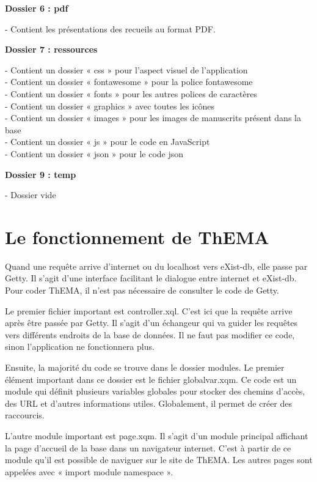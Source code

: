 \textbf{Dossier 6 : pdf} 
\begin{flushleft}	
	- Contient les présentations des recueils au format PDF.
\end{flushleft}	
	
\textbf{Dossier 7 : ressources}
\begin{flushleft}		
	 - Contient un dossier « css » pour l'aspect visuel de l'application \\
	 - Contient un dossier « fontawesome » pour la police fontawesome \\
	 - Contient un dossier « fonts » pour les autres polices de caractères \\
	 - Contient un dossier « graphics » avec toutes les icônes \\
	 - Contient un dossier « images » pour les images de manuscrits présent dans la base \\
	 - Contient un dossier « js » pour le code en JavaScript \\
	 - Contient un dossier « json » pour le code json \\
\end{flushleft}	
 
\textbf{Dossier 9 : temp}
\begin{flushleft}	
	 - Dossier vide
\end{flushleft}	
	
	\section{Le fonctionnement de ThEMA}
	Quand une requête arrive d'internet ou du localhost vers eXist-db, elle passe par Getty. Il s'agit d'une interface facilitant le dialogue entre internet et eXist-db. Pour coder ThEMA, il n'est pas nécessaire de consulter le code de Getty.
	
	Le premier fichier important est controller.xql. C'est ici que la requête arrive après être passée par Getty. Il s'agit d'un échangeur qui va guider les requêtes vers différents endroits de la base de données. Il ne faut pas modifier ce code, sinon l'application ne fonctionnera plus.
	
	Ensuite, la majorité du code se trouve dans le dossier modules. Le premier élément important dans ce dossier est le fichier globalvar.xqm. Ce code est un module  qui définit plusieurs variables globales pour stocker des chemins d'accès, des URL et d'autres informations utiles. Globalement, il permet de créer des raccourcis.
	
	L'autre module important est page.xqm. Il s'agit d'un module principal affichant la page d'accueil de la base dans un navigateur internet. C'est à partir de ce module qu'il est possible de naviguer sur le site de ThEMA. Les autres pages sont appelées avec « import module namespace ».
	
